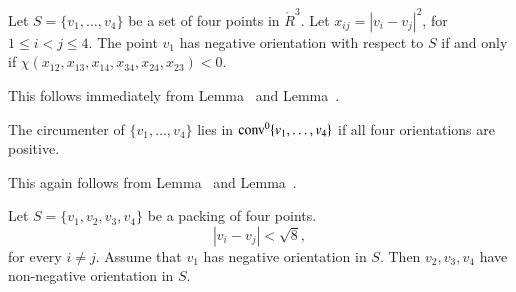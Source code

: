 \begin{tarskidata}
\begin{tarski}

\begin{lemma} 
Let $S=\{v_1,\ldots,v_4\}$ be a set of four points
in $\ring{R}^3$.  
Let $x_{ij}=|v_i-v_j|^2$, for $1\le i< j\le 4$.
The point $v_1$ has negative
orientation with respect to $S$ if and only if
    $\chi(x_{12},x_{13},x_{14},x_{34},x_{24},
    x_{23})<0$.
\end{lemma}

\begin{proved} 
This follows immediately from  Lemma~ and 
Lemma~.
\swallowed\end{proved}
\end{tarski}



\begin{tarski}

\begin{lemma}
The circumenter of $\{v_1,\ldots,v_4\}$ lies in
${\operatorname{conv}}^0\{v_1,\ldots,v_4\}$ if all four
orientations are positive.
\end{lemma}

\begin{proved}  This again follows from
Lemma~ and 
Lemma~.
\swallowed\end{proved}
\end{tarski}






\begin{tarski}

\begin{lemma} 
Let $S=\{v_1,v_2,v_3,v_4\}$ be a packing of four points.
   $$
   |v_i-v_j| < \sqrt8,
   $$
for every $i\ne j$.
Assume that $v_1$ has negative orientation in $S$.  Then
$v_2,v_3,v_4$ have non-negative orientation in $S$.
\end{lemma}



\end{tarski}
\end{tarskidata}
